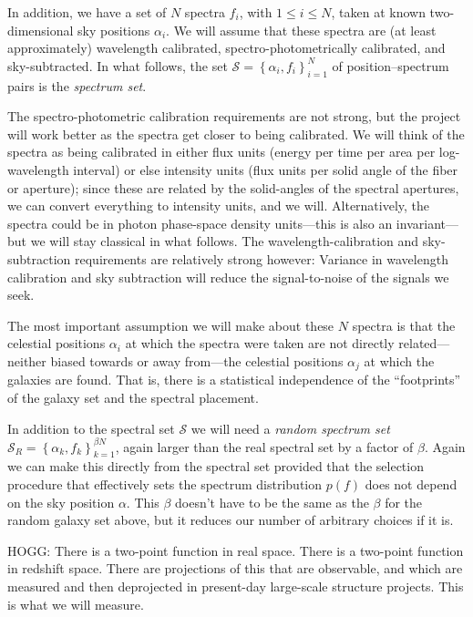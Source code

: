 \documentclass{article}
\newcommand{\setof}[1]{\left\{{#1}\right\}}
\newcommand{\set}[1]{\mathscr{#1}}
\begin{document}
In addition, we have a set of $N$ spectra $f_i$, with $1\leq i\leq N$, taken at known two-dimensional sky positions $\alpha_i$.
We will assume that these spectra are (at least approximately) wavelength calibrated, spectro-photometrically calibrated, and sky-subtracted.
In what follows, the set $\set{S}=\setof{\alpha_i, f_i}_{i=1}^N$ of position--spectrum pairs is the \emph{spectrum set}.

The spectro-photometric calibration requirements are not strong, but the project will work better as the spectra get closer to being calibrated.
We will think of the spectra as being calibrated in either flux units (energy per time per area per log-wavelength interval) or else intensity units (flux units per solid angle of the fiber or aperture); since these are related by the solid-angles of the spectral apertures, we can convert everything to intensity units, and we will.
Alternatively, the spectra could be in photon phase-space density units---this is also an invariant---but we will stay classical in what follows.
The wavelength-calibration and sky-subtraction requirements are relatively strong however:
Variance in wavelength calibration and sky subtraction will reduce the signal-to-noise of the signals we seek.

The most important assumption we will make about these $N$ spectra is that the celestial positions $\alpha_i$ at which the spectra were taken are not directly related---neither biased towards or away from---the celestial positions $\alpha_j$ at which the galaxies are found.
That is, there is a statistical independence of the ``footprints'' of the galaxy set and the spectral placement.

In addition to the spectral set $\set{S}$ we will need a \emph{random spectrum set} $\set{S}_R=\setof{\alpha_k,f_k}_{k=1}^{\beta N}$, again larger than the real spectral set by a factor of $\beta$.
Again we can make this directly from the spectral set provided that the selection procedure that effectively sets the spectrum distribution $p(f)$ does not depend on the sky position $\alpha$.
This $\beta$ doesn't have to be the same as the $\beta$ for the random galaxy set above, but it reduces our number of arbitrary choices if it is.

HOGG: There is a two-point function in real space. There is a two-point function in redshift space. There are projections of this that are observable, and which are measured and then deprojected in present-day large-scale structure projects. This is what we will measure.
\end{document}
